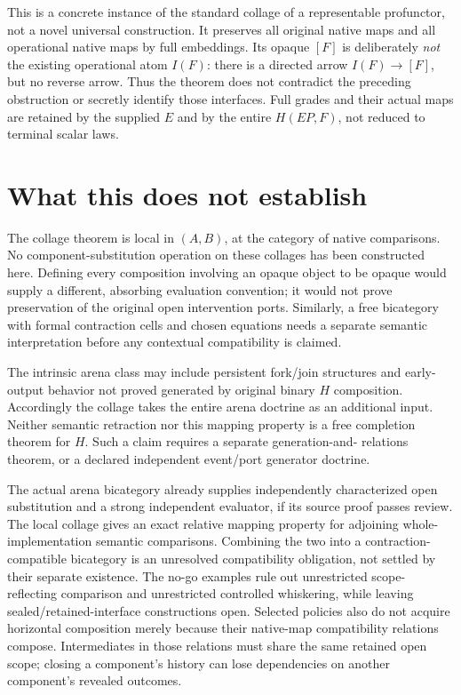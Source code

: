 \documentclass{article}
\begin{document}
This is a concrete instance of the standard collage of a representable
profunctor, not a novel universal construction. It preserves all original
native maps and all operational native maps by full embeddings. Its opaque
$[F]$ is deliberately \emph{not} the existing operational atom $I(F)$:
there is a directed arrow $I(F)\to[F]$, but no reverse arrow. Thus the theorem
does not contradict the preceding obstruction or secretly identify those
interfaces. Full grades and their actual maps are retained by the supplied
$E$ and by the entire $H(EP,F)$, not reduced to terminal scalar laws.

\section{What this does not establish}
The collage theorem is local in $(A,B)$, at the category of native
comparisons. No component-substitution operation on these collages has been
constructed here. Defining every composition involving an opaque object to
be opaque would supply a different, absorbing evaluation convention; it would
not prove preservation of the original open intervention ports. Similarly,
a free bicategory with formal contraction cells and chosen equations needs
a separate semantic interpretation before any contextual compatibility is
claimed.

The intrinsic arena class may include persistent fork/join structures and
early-output behavior not proved generated by original binary $H$ composition.
Accordingly the collage takes the entire arena doctrine as an additional
input. Neither semantic retraction nor this mapping property is a free
completion theorem for $H$. Such a claim requires a separate generation-and-
relations theorem, or a declared independent event/port generator doctrine.

The actual arena bicategory already supplies independently characterized
open substitution and a strong independent evaluator, if its source proof
passes review. The local collage gives an exact relative mapping property
for adjoining whole-implementation semantic comparisons. Combining the two
into a contraction-compatible bicategory is an unresolved compatibility
obligation, not settled by their separate existence. The no-go examples rule
out unrestricted scope-reflecting comparison and unrestricted controlled
whiskering, while leaving sealed/retained-interface constructions open.
Selected policies also do not acquire horizontal composition merely because
their native-map compatibility relations compose. Intermediates in those
relations must share the same retained open scope; closing a component's
history can lose dependencies on another component's revealed outcomes.
\end{document}
